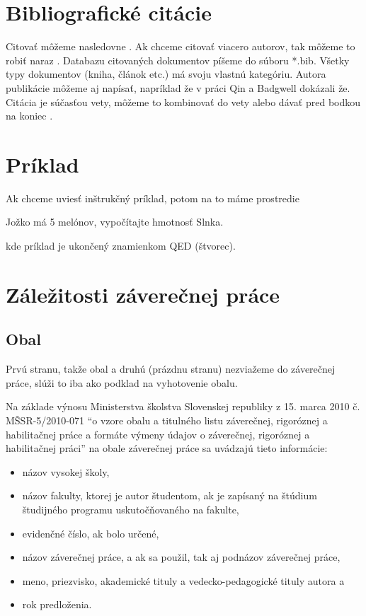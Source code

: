 \section{Bibliografické citácie}

Citovať môžeme nasledovne \cite{Eykhoff84}. Ak chceme citovať viacero autorov, tak môžeme to robiť naraz \cite{Fontes00,Eykhoff84}. Databazu citovaných dokumentov píšeme do súboru *.bib. Všetky typy dokumentov (kniha, článok etc.) má svoju vlastnú kategóriu. Autora publikácie môžeme aj napísať, napríklad že v práci Qin a Badgwell \cite{Qin99} dokázali že. Citácia je súčasťou vety, môžeme to kombinovať do vety \cite{Karny80} alebo dávať pred bodkou na koniec \cite{Far90}.

\section{Príklad}

Ak chceme uviesť inštrukčný príklad, potom na to máme prostredie
\begin{exmp}
	Jožko má 5 melónov, vypočítajte hmotnosť Slnka.
\end{exmp}
kde príklad je ukončený znamienkom QED (štvorec).


\section{Záležitosti záverečnej práce}

\subsection{Obal}

Prvú stranu, takže obal a druhú (prázdnu stranu) nezviažeme do záverečnej práce, slúži to iba ako podklad na vyhotovenie obalu.

Na základe výnosu Ministerstva školstva Slovenskej republiky z 15. marca 2010 č. MŠSR-5/2010-071 ``o vzore obalu a titulného listu záverečnej, rigoróznej a habilitačnej práce a formáte výmeny údajov o záverečnej, rigoróznej a habilitačnej práci''  na obale záverečnej práce sa uvádzajú tieto informácie:
\begin{itemize}
	\item  názov vysokej školy,
	\item názov fakulty, ktorej je autor študentom, ak je zapísaný na štúdium študijného programu
	uskutočňovaného na fakulte,
	\item evidenčné číslo, ak bolo určené,
	\item názov záverečnej práce, a ak sa použil, tak aj podnázov záverečnej práce,
	\item meno, priezvisko, akademické tituly a vedecko-pedagogické tituly autora a
	\item rok predloženia.
\end{itemize}

